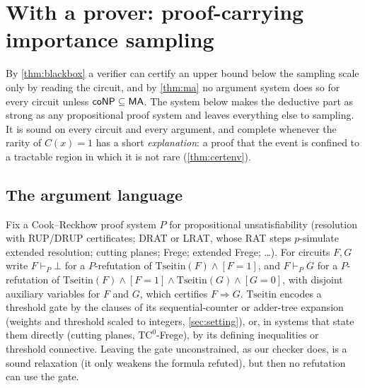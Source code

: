 \section{With a prover: proof-carrying importance sampling}\label{sec:part2}

By \cref{thm:blackbox} a verifier can certify an upper bound below the
sampling scale only by reading the circuit, and by \cref{thm:ma} no argument
system does so for every circuit unless $\mathsf{coNP}\subseteq\mathsf{MA}$. The system below
makes the deductive part as strong as any propositional proof system and leaves
everything else to sampling. It is sound on every circuit and every argument, and complete
whenever the rarity of $C(x)=1$ has a short \emph{explanation}: a proof
that the event is confined to a tractable region in which it is not rare
(\cref{thm:certenv}).

\subsection{The argument language}\label{sec:pcis}

Fix a Cook--Reckhow proof system $P$ for propositional unsatisfiability
(resolution with RUP/\allowbreak DRUP certificates; DRAT or LRAT, whose RAT steps
$p$-simulate extended resolution; cutting planes; Frege; extended Frege; \dots).
For circuits $F,G$ write $F\vdash_P\bot$ for a $P$-refutation of
$\mathrm{Tseitin}(F)\wedge[F=1]$, and $F\vdash_PG$ for a $P$-refutation of
$\mathrm{Tseitin}(F)\wedge[F=1]\wedge\mathrm{Tseitin}(G)\wedge[G=0]$, with
disjoint auxiliary variables for $F$ and $G$, which certifies $F\Rightarrow G$.
$\mathrm{Tseitin}$ encodes a threshold gate by the clauses of its sequential-counter
or adder-tree expansion (weights and threshold scaled to integers, \cref{sec:setting}),
or, in systems that state them directly (cutting planes, $\mathrm{TC}^0$-Frege), by
its defining inequalities or threshold connective. Leaving the gate unconstrained, as
our checker does, is a sound relaxation (it only weakens the formula refuted), but
then no refutation can use the gate.

